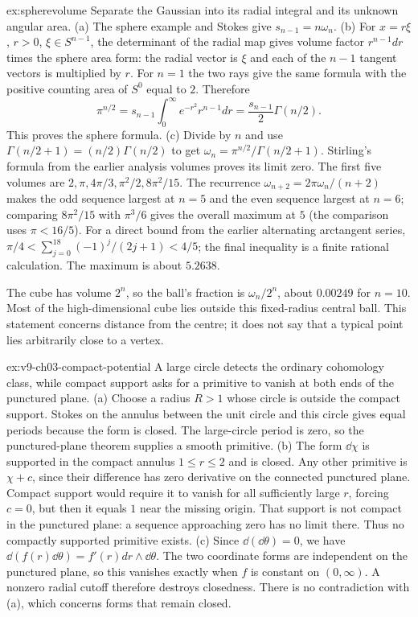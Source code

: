 \begin{solution}{ex:spherevolume}
\idea Separate the Gaussian into its radial integral and its unknown angular area.
\writeup (a) The sphere example and Stokes give $s_{n-1}=n\omega_n$.
(b) For $x=r\xi$, $r>0$, $\xi\in S^{n-1}$, the determinant of the radial map gives volume factor $r^{n-1}dr$ times the sphere area form: the radial vector is $\xi$ and each of the $n-1$ tangent vectors is multiplied by $r$. For $n=1$ the two rays give the same formula with the positive counting area of $S^0$ equal to $2$. Therefore
\[
\pi^{n/2}=s_{n-1}\int_0^\infty e^{-r^2}r^{n-1}dr
=\frac{s_{n-1}}2\Gamma(n/2).
\]
This proves the sphere formula.
(c) Divide by $n$ and use $\Gamma(n/2+1)=(n/2)\Gamma(n/2)$ to get $\omega_n=\pi^{n/2}/\Gamma(n/2+1)$. Stirling's formula from the earlier analysis volumes proves its limit zero. The first five volumes are $2,\pi,4\pi/3,\pi^2/2,8\pi^2/15$. The recurrence $\omega_{n+2}=2\pi\omega_n/(n+2)$ makes the odd sequence largest at $n=5$ and the even sequence largest at $n=6$; comparing $8\pi^2/15$ with $\pi^3/6$ gives the overall maximum at $5$ (the comparison uses $\pi<16/5$). For a direct bound from the earlier alternating arctangent series, $\pi/4<\sum_{j=0}^{18}(-1)^j/(2j+1)<4/5$; the final inequality is a finite rational calculation. The maximum is about $5.2638$.

The cube has volume $2^n$, so the ball's fraction is $\omega_n/2^n$, about $0.00249$ for $n=10$. Most of the high-dimensional cube lies outside this fixed-radius central ball. This statement concerns distance from the centre; it does not say that a typical point lies arbitrarily close to a vertex.
\end{solution}

\begin{solution}{ex:v9-ch03-compact-potential}
\idea A large circle detects the ordinary cohomology class, while compact support asks for a primitive to vanish at both ends of the punctured plane.
\writeup (a) Choose a radius $R>1$ whose circle is outside the compact support. Stokes on the annulus between the unit circle and this circle gives equal periods because the form is closed. The large-circle period is zero, so the punctured-plane theorem supplies a smooth primitive.
(b) The form $\dd\chi$ is supported in the compact annulus $1\le r\le2$ and is closed. Any other primitive is $\chi+c$, since their difference has zero derivative on the connected punctured plane. Compact support would require it to vanish for all sufficiently large $r$, forcing $c=0$, but then it equals $1$ near the missing origin. That support is not compact in the punctured plane: a sequence approaching zero has no limit there. Thus no compactly supported primitive exists.
(c) Since $\dd(\dd\theta)=0$, we have $\dd(f(r)\dd\theta)=f'(r)dr\wedge\dd\theta$. The two coordinate forms are independent on the punctured plane, so this vanishes exactly when $f$ is constant on $(0,\infty)$. A nonzero radial cutoff therefore destroys closedness. There is no contradiction with (a), which concerns forms that remain closed.
\end{solution}

